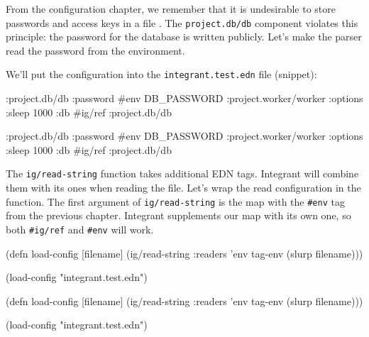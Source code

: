 
From the configuration chapter, we remember that it is undesirable to store passwords and access keys in a file . The \verb|project.db/db| component violates this principle: the password for the database is written publicly. Let's make the parser read the password from the environment.

We'll put the configuration into the \texttt{integrant\-.test.edn} file (snippet):

\ifnarrow

\begin{english}
  \begin{clojure}
{:project.db/db
 {:password #env DB_PASSWORD}
 :project.worker/worker
 {:options {:sleep 1000}
  :db #ig/ref :project.db/db}}
  \end{clojure}
\end{english}

\else

\begin{english}
  \begin{clojure}
{:project.db/db {:password #env DB_PASSWORD}
 :project.worker/worker {:options {:sleep 1000}
                         :db #ig/ref :project.db/db}}
  \end{clojure}
\end{english}

\fi

The \verb|ig/read-string| function takes additional EDN tags. Integrant will combine them with its ones when reading the file. Let's wrap the read configuration in the function. The first argument of \verb|ig/read-string| is the map with the \verb|#env| tag from the previous chapter. Integrant supplements our map with its own one, so both \verb|#ig/ref| and \verb|#env| will work.

\ifnarrow

\begin{english}
  \begin{clojure}
(defn load-config [filename]
  (ig/read-string
    {:readers {'env tag-env}}
    (slurp filename)))

(load-config "integrant.test.edn")
  \end{clojure}
\end{english}

\else

\begin{english}
  \begin{clojure}
(defn load-config [filename]
  (ig/read-string {:readers {'env tag-env}}
                  (slurp filename)))

(load-config "integrant.test.edn")
  \end{clojure}
\end{english}

